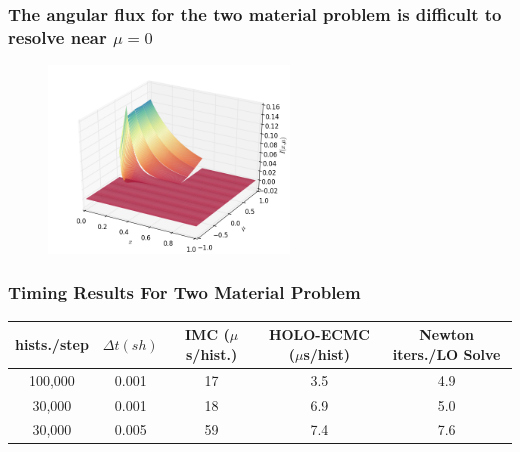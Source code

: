 \documentclass[xcolor=dvipsnames,hyperref={pdfpagelabels=false},unknownkeysallowed]{beamer}
\begin{document}
\begin{frame}   
    \frametitle{The angular flux for the two material problem is difficult to resolve near
    $\mu=0$}
    \begin{figure}
        \includegraphics[width=0.57\textwidth]{ang_flux.png}
    \end{figure}
\end{frame}

\begin{frame}
    \frametitle{Timing Results For Two Material Problem}
\begin{table}[htb!]
\centering
	\begin{tabular}{|cc|c|cc|} \hline
hists./step & $\Delta t (sh)$ & IMC ($\mu$s/hist.) & HOLO-ECMC ($\mu$s/hist)  &
Newton iters./LO Solve\\ \hline
100,000          &   0.001	& 17  &	3.5   & 4.9 \\
30,000   &    0.001	& 18  &	6.9   &    5.0 \\
30,000    &   0.005	& 59  & 7.4   &    7.6 \\ \hline
\end{tabular}
\end{table}

\end{frame}


\end{document}
